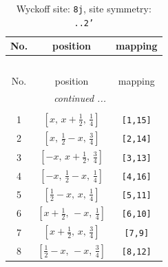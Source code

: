 \documentclass[fleqn,8pt]{jsarticle}
\begin{document}
\begin{longtable}{ccc}
\caption{Wyckoff site: {\tt 8j}, site symmetry: {\tt ..2'}}
 \\
 \hline \hline
No. & position & mapping \\ \hline \endfirsthead

\multicolumn{2}{l}{\tablename\ \thetable{}} \\
 \hline \hline
No. & position & mapping \\ \hline \endhead

 \hline \hline
\multicolumn{2}{r}{\footnotesize\it continued ...} \\ \endfoot

 \hline \hline
\multicolumn{2}{r}{} \\ \endlastfoot

1 & $\left[ x,\, x + \frac{1}{2},\, \frac{1}{4} \right]$ & {\tt [1,15]} \\ \hline
2 & $\left[ x,\, \frac{1}{2} - x,\, \frac{3}{4} \right]$ & {\tt [2,14]} \\ \hline
3 & $\left[ - x,\, x + \frac{1}{2},\, \frac{3}{4} \right]$ & {\tt [3,13]} \\ \hline
4 & $\left[ - x,\, \frac{1}{2} - x,\, \frac{1}{4} \right]$ & {\tt [4,16]} \\ \hline
5 & $\left[ \frac{1}{2} - x,\, x,\, \frac{1}{4} \right]$ & {\tt [5,11]} \\ \hline
6 & $\left[ x + \frac{1}{2},\, - x,\, \frac{1}{4} \right]$ & {\tt [6,10]} \\ \hline
7 & $\left[ x + \frac{1}{2},\, x,\, \frac{3}{4} \right]$ & {\tt [7,9]} \\ \hline
8 & $\left[ \frac{1}{2} - x,\, - x,\, \frac{3}{4} \right]$ & {\tt [8,12]} \\
\end{longtable}
\renewcommand{\arraystretch}{1.2}
\end{document}
